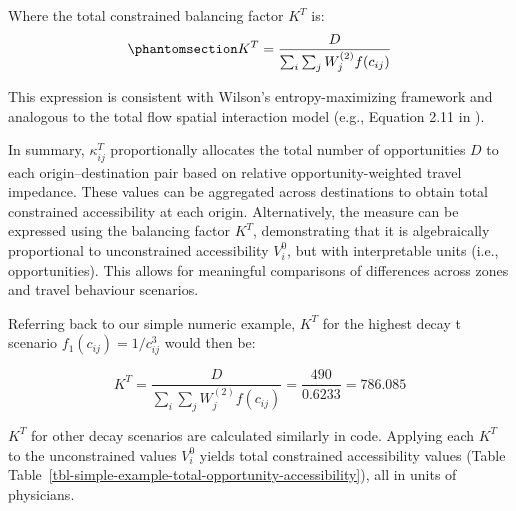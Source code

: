 \documentclass[
  10pt,
  letterpaper,
]{article}
\begin{document}
Where the total constrained balancing factor \(K^T\) is:
\begin{equation}\phantomsection\label{eq-total-opportunity-balancing-factor}{
K^T = \frac{D}{\sum_i\sum_j W^{(2)}_jf(c_{ij})}
}\end{equation}

This expression is consistent with Wilson's entropy-maximizing framework
and analogous to the total flow spatial interaction model (e.g.,
Equation 2.11 in \citep{cliff_evaluating_1974}).

In summary, \(\kappa_{ij}^T\) proportionally allocates the total number
of opportunities \(D\) to each origin--destination pair based on
relative opportunity-weighted travel impedance. These values can be
aggregated across destinations to obtain total constrained accessibility
at each origin. Alternatively, the measure can be expressed using the
balancing factor \(K^T\), demonstrating that it is algebraically
proportional to unconstrained accessibility \(V_i^0\), but with
interpretable units (i.e., opportunities). This allows for meaningful
comparisons of differences across zones and travel behaviour scenarios.

Referring back to our simple numeric example, \(K^T\) for the highest
decay t scenario \(f_1(c_{ij}) = 1/c_{ij}^3\) would then be:

\[
K^T = \frac{D}{\sum_{i}\sum_{j} W_j^{(2)} f(c_{ij})} = \frac{490}{0.6233} = 786.085
\]

\(K^T\) for other decay scenarios are calculated similarly in code.
Applying each \(K^T\) to the unconstrained values \(V_i^0\) yields total
constrained accessibility values (Table
Table~\ref{tbl-simple-example-total-opportunity-accessibility}), all in
units of physicians.
\end{document}
